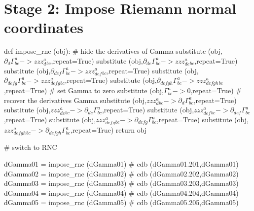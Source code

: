 \documentclass[12pt]{cdblatex}
\begin{document}


\clearpage

\section*{Stage 2: Impose Riemann normal coordinates}

\begin{cadabra}
   def impose_rnc (obj):
       # hide the derivatives of Gamma
       substitute (obj,$\partial_{d}{\Gamma^{a}_{b c}} -> zzz_{d}^{a}_{b c}$,repeat=True)
       substitute (obj,$\partial_{d e}{\Gamma^{a}_{b c}} -> zzz_{d e}^{a}_{b c}$,repeat=True)
       substitute (obj,$\partial_{d e f}{\Gamma^{a}_{b c}} -> zzz_{d e f}^{a}_{b c}$,repeat=True)
       substitute (obj,$\partial_{d e f g}{\Gamma^{a}_{b c}} -> zzz_{d e f g}^{a}_{b c}$,repeat=True)
       substitute (obj,$\partial_{d e f g h}{\Gamma^{a}_{b c}} -> zzz_{d e f g h}^{a}_{b c}$,repeat=True)
       # set Gamma to zero
       substitute (obj,$\Gamma^{a}_{b c} -> 0$,repeat=True)
       # recover the derivatives Gamma
       substitute (obj,$zzz_{d}^{a}_{b c} -> \partial_{d}{\Gamma^{a}_{b c}}$,repeat=True)
       substitute (obj,$zzz_{d e}^{a}_{b c} -> \partial_{d e}{\Gamma^{a}_{b c}}$,repeat=True)
       substitute (obj,$zzz_{d e f}^{a}_{b c} -> \partial_{d e f}{\Gamma^{a}_{b c}}$,repeat=True)
       substitute (obj,$zzz_{d e f g}^{a}_{b c} -> \partial_{d e f g}{\Gamma^{a}_{b c}}$,repeat=True)
       substitute (obj,$zzz_{d e f g h}^{a}_{b c} -> \partial_{d e f g h}{\Gamma^{a}_{b c}}$,repeat=True)
       return obj

   # switch to RNC

   dGamma01 = impose_rnc (dGamma01)   # cdb (dGamma01.201,dGamma01)
   dGamma02 = impose_rnc (dGamma02)   # cdb (dGamma02.202,dGamma02)
   dGamma03 = impose_rnc (dGamma03)   # cdb (dGamma03.203,dGamma03)
   dGamma04 = impose_rnc (dGamma04)   # cdb (dGamma04.204,dGamma04)
   dGamma05 = impose_rnc (dGamma05)   # cdb (dGamma05.205,dGamma05)

\end{cadabra}
\end{document}
